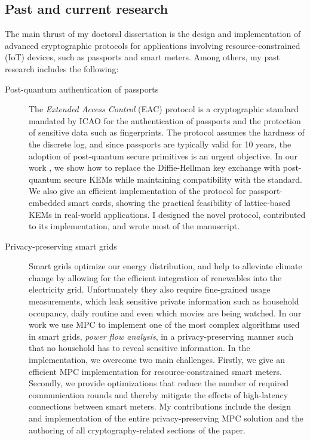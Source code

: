 \documentclass{article}
\begin{document}
\subsection*{Past and current research}
The main thrust of my doctoral dissertation is the design and implementation of advanced cryptographic protocols for applications involving resource-constrained (IoT) devices, such as passports and smart meters. Among others, my past research includes the following:
\begin{description}
    \item[Post-quantum authentication of passports] The \textit{Extended Access Control} (EAC) protocol is a cryptographic standard mandated by ICAO for the authentication of passports and the protection of sensitive data such as fingerprints. The protocol assumes the hardness of the discrete log, and since passports are typically valid for 10 years, the adoption of post-quantum secure primitives is an urgent objective. In our work \cite{FischlinHMMWB23}, we show how to replace the Diffie-Hellman key exchange with post-quantum secure KEMs while maintaining compatibility with the standard. We also give an efficient implementation of the protocol for passport-embedded smart cards, showing the practical feasibility of lattice-based KEMs in real-world applications. I designed the novel protocol, contributed to its implementation, and wrote most of the manuscript.
    \item[Privacy-preserving smart grids] Smart grids optimize our energy distribution, and help to alleviate climate change by allowing for the efficient integration of renewables into the electricity grid. Unfortunately they also require fine-grained usage measurements, which leak sensitive private information such as household occupancy, daily routine and even which movies are being watched. In our work \cite{HeydenSBAZJD25} we use MPC to implement one of the most complex algorithms used in smart grids, \textit{power flow analysis}, in a privacy-preserving manner such that no household has to reveal sensitive information. In the implementation, we overcome two main challenges. Firstly, we give an efficient MPC implementation for resource-constrained smart meters. Secondly, we provide optimizations that reduce the number of required communication rounds and thereby mitigate the effects of high-latency connections between smart meters. My contributions include the design and implementation of the entire privacy-preserving MPC solution and the authoring of all cryptography-related sections of the paper.

\end{description}
\end{document}
